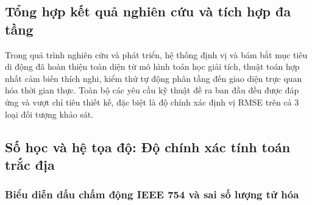 \begin{table}[H]
\centering
\caption{Thống kê định lượng tổng quan hệ thống bám bắt}
\label{tab:system-stats}
\end{table}

\subsection{Tổng hợp kết quả nghiên cứu và tích hợp đa tầng}

\hspace{0.5cm} Trong quá trình nghiên cứu và phát triển, hệ thống định vị và bám bắt mục tiêu di động đã hoàn thiện toàn diện từ mô hình toán học giải tích, thuật toán hợp nhất cảm biến thích nghi, kiểm thử tự động phân tầng đến giao diện trực quan hóa thời gian thực. Toàn bộ các yêu cầu kỹ thuật đề ra ban đầu đều được đáp ứng và vượt chỉ tiêu thiết kế, đặc biệt là độ chính xác định vị RMSE trên cả 3 loại đối tượng khảo sát.

\subsection{Số học và hệ tọa độ: Độ chính xác tính toán trắc địa}

\subsubsection{Biểu diễn dấu chấm động IEEE 754 và sai số lượng tử hóa}

